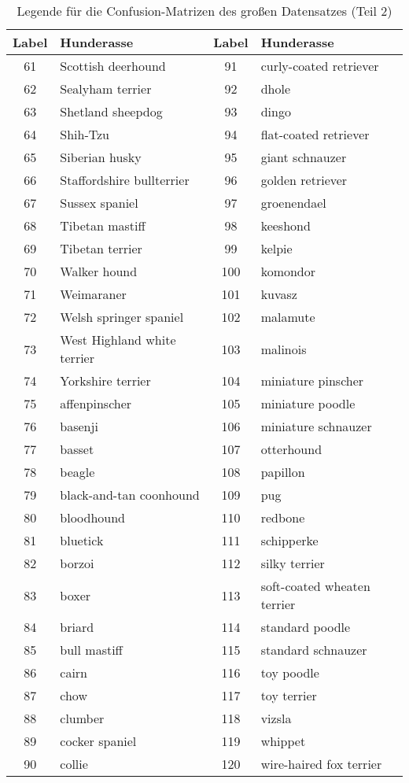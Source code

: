 	 \begin{table}
	 	\centering
	 	\caption{Legende für die Confusion-Matrizen des großen Datensatzes (Teil 2)}
	 	\label{tab:legende_rf_2}
	  \begin{tabular}{c l | c l}
	 	\toprule
		{Label} &
		{Hunderasse} & {Label} &
		{Hunderasse} \\
	 	\midrule
		 61 & Scottish deerhound & 91 & curly-coated retriever \\
		 62 & Sealyham terrier & 92 & dhole \\
		 63 & Shetland sheepdog & 93 & dingo \\
		 64 & Shih-Tzu & 94 & flat-coated retriever \\
		 65 & Siberian husky & 95 & giant schnauzer \\
		 66 & Staffordshire bullterrier & 96 & golden retriever \\
		 67 & Sussex spaniel & 97 & groenendael \\
		 68 & Tibetan mastiff & 98 & keeshond \\
		 69 & Tibetan terrier & 99 & kelpie \\
		 70 & Walker hound & 100 & komondor \\
		 71 & Weimaraner & 101 & kuvasz \\
		 72 & Welsh springer spaniel & 102 & malamute \\
		 73 & West Highland white terrier & 103 & malinois \\
		 74 & Yorkshire terrier & 104 & miniature pinscher \\
		 75 & affenpinscher & 105 & miniature poodle \\
		 76 & basenji & 106 & miniature schnauzer \\
		 77 & basset & 107 & otterhound \\
		 78 & beagle & 108 & papillon \\
		 79 & black-and-tan coonhound & 109 & pug \\
		 80 & bloodhound & 110 & redbone \\
		 81 & bluetick & 111 & schipperke \\
		 82 & borzoi & 112 & silky terrier \\
		 83 & boxer & 113 & soft-coated wheaten terrier \\
		 84 & briard & 114 & standard  poodle \\
		 85 & bull mastiff & 115 & standard schnauzer \\
		 86 & cairn & 116 & toy poodle \\
		 87 & chow & 117 & toy terrier \\
		 88 & clumber & 118 & vizsla \\
		 89 & cocker spaniel & 119 & whippet \\
		 90 & collie & 120 & wire-haired fox terrier \\
	\bottomrule
	\end{tabular}
\end{table}
